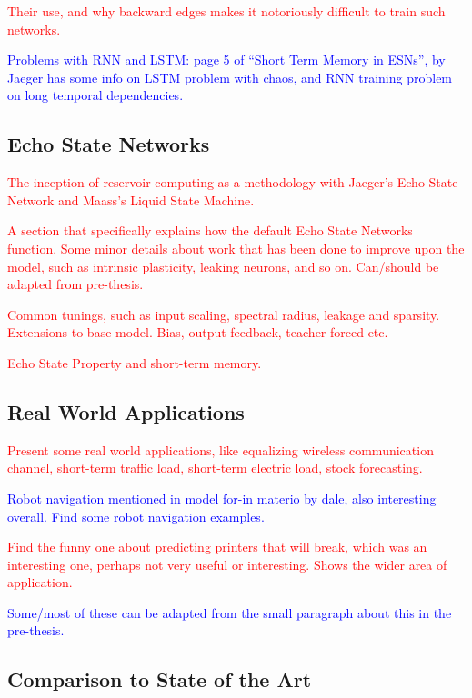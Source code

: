 \textcolor{red}{
  Their use, and why backward edges makes it notoriously difficult to train such
networks.
}

\textcolor{blue}{
  Problems with RNN and LSTM: page 5 of ``Short Term Memory in ESNs'', by Jaeger
has some info on LSTM problem with chaos, and RNN training problem on long
temporal dependencies.
}

\subsection{Echo State Networks}

\textcolor{red}{
  The inception of reservoir computing as a methodology with Jaeger's Echo State
Network and Maass's Liquid State Machine.
}

\textcolor{red}{
  A section that specifically explains how the default Echo State Networks
function. Some minor details about work that has been done to improve upon the
model, such as intrinsic plasticity, leaking neurons, and so on. Can/should be
adapted from pre-thesis.
}

\textcolor{red}{
  Common tunings, such as input scaling, spectral radius, leakage and
sparsity. Extensions to base model. Bias, output feedback, teacher forced etc.
}

\textcolor{red}{
  Echo State Property and short-term memory.
}

\subsection{Real World Applications}

\textcolor{red}{
  Present some real world applications, like equalizing wireless communication
  channel, short-term traffic load, short-term electric load, stock forecasting.
}

\textcolor{blue}{
  Robot navigation mentioned in model for-in materio by dale, also interesting
overall. Find some robot navigation examples.
}

\textcolor{red}{
  Find the funny one about predicting printers that will break, which was an
interesting one, perhaps not very useful or interesting. Shows the wider area of
application.
}

\textcolor{blue}{
  Some/most of these can be adapted from the small paragraph about this in the
pre-thesis.
}

\subsection{Comparison to State of the Art}

